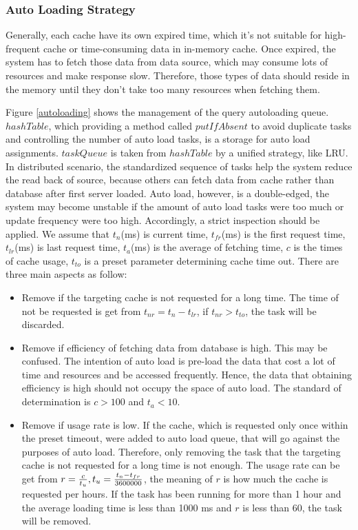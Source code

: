 \documentclass{singlecol-new}
\theoremstyle{TH}{
\newtheorem{lemma}{Lemma}
\newtheorem{theorem}[lemma]{Theorem}
\newtheorem{corrolary}[lemma]{Corrolary}
\newtheorem{conjecture}[lemma]{Conjecture}
\newtheorem{proposition}[lemma]{Proposition}
\newtheorem{claim}[lemma]{Claim}
\newtheorem{stheorem}[lemma]{Wrong Theorem}
}
\theoremstyle{THrm}{
\newtheorem{definition}{Definition}[section]
\newtheorem{question}{Question}[section]
\newtheorem{remark}{Remark}
\newtheorem{scheme}{Scheme}
}
\theoremstyle{THhit}{
\newtheorem{case}{Case}[section]
}
\begin{document}
\subsubsection{Auto Loading Strategy}
Generally, each cache have its own expired time, which it's not suitable for high-frequent cache or time-consuming data in in-memory cache. Once expired, the system has to fetch those data from data source, which may consume lots of resources and make response slow. Therefore, those types of data should reside in the memory until they don't take too many resources when fetching them.

Figure \ref{autoloading} shows the management of the query autoloading queue. $hashTable$, which providing a method called $putIfAbsent$ to avoid duplicate tasks and controlling the number of auto load tasks, is a storage for auto load assignments. $taskQueue$ is taken from $hashTable$ by a unified strategy, like LRU. In distributed scenario, the standardized sequence of tasks help the system reduce the read back of source, because others can fetch data from cache rather than database after first server loaded. Auto load, however, is a double-edged, the system may become unstable if the amount of auto load tasks were too much or update frequency were too high. Accordingly, a strict inspection should be applied. We assume that $t_n$(ms) is current time, $t_{fr}$(ms) is the first request time, $t_{lr}$(ms) is last request time,  $t_a$(ms) is the average of fetching time, $c$ is the times of cache usage, $t_{to}$ is a preset parameter determining cache time out. There are three main aspects as follow:

\begin{itemize}
    \item Remove if the targeting cache is not requested for a long time. The time of not be requested is get from $t_{nr} = t_n - t_{lr}$, if $t_{nr} > t_{to}$, the task will be discarded.
    \item Remove if efficiency of fetching data from database is high. This may be confused. The intention of auto load is pre-load the data that cost a lot of time and resources and be accessed frequently. Hence, the data that obtaining efficiency is high should not occupy the space of auto load. The standard of determination is $c > 100$ and $t_a < 10$.
    \item Remove if usage rate is low. If the cache, which is requested only once within the preset timeout, were added to auto load queue, that will go against the purposes of auto load. Therefore, only removing the task that the targeting cache is not requested for a long time is not enough. The usage rate can be get from $r = \frac{c}{t_u}, t_u = {{t_n - t_{fr}}\over{3600000}}$, the meaning of $r$ is how much the cache is requested per hours. If the task has been running for more than 1 hour and the average loading time is less than 1000 ms and $r$ is less than 60, the task will be removed.
\end{itemize}{}
\end{document}
